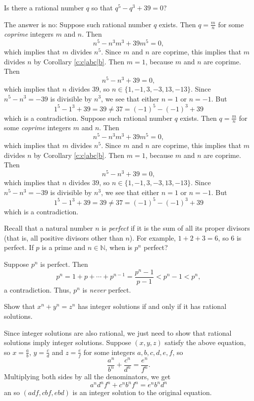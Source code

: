 \documentclass[11pt,dvipsnames]{book}
\numberwithin{figure}{section} %
\numberwithin{table}{section} %
\begin{document}
\begin{exercise} Is there a rational number $q$ so that $q^{5}-q^{3}+39=0$?

\begin{solution}
 The answer is no: Suppose such rational number $q$ exists. Then $q=\frac{m}{n}$ for some {\it coprime} integers $m$ and $n$. Then
\[
n^5-n^3m^3 + 39m^5 = 0,\]
which implies that $m$ divides $n^5$. Since $m$ and $n$ are coprime, this implies
that $m$ divides $n$ by Corollary \ref{c:c|abc|b}. Then $m = 1$, because $m$ and $n$ are coprime. Then
\[
n^5-n^3+39=0,
\]
which implies that $n$ divides $ 39$, so $n\in \{1,-1, 3,-3, 13,-13\}$. Since
$n^5-n^3 =-39$  is divisible by $n^3$, we see that either $n=1$ or $n=-1$. But
\[1^{5}-1^3+39=39\neq 37 = (-1)^{5}-(-1)^{3}+39\]
which is a contradiction. Suppose such rational number $q$ exists. Then $q=\frac{m}{n}$ for some {\it coprime} integers $m$ and $n$. Then
\[
n^5-n^3m^3 + 39m^5 = 0,\]
which implies that $m$ divides $n^5$. Since $m$ and $n$ are coprime, this implies
that $m$ divides $n$ by Corollary \ref{c:c|abc|b}. Then $m=1$, because $m$ and $n$ are coprime. Then
\[
n^5-n^3 +39=0,
\]
which implies that $n$ divides $ 39$, so $n\in \{1, -1, 3, -3, 13, -13\}$. Since
$n^5-n^3 =-39$  is divisible by $n^3$, we see that either $n=1$ or $n=-1$. But
\[1^{5}-1^3+39=39\neq 37 = (-1)^{5}-(-1)^{3}+39\]
which is a contradiction.
\end{solution}

\end{exercise}

\begin{exercise} Recall that a natural number $n$ is {\it perfect} if it is the sum of all its proper divisors (that is, all positive divisors other than $n$). For example, $1 + 2 + 3 = 6$, so $6$ is perfect. If $p$ is a prime and $n\in\mathbb{N}$, when is $p^{n}$ perfect?

\begin{solution}
Suppose $p^{n}$ is perfect. Then
\[
p^{n} = 1+p+\cdots + p^{n-1} = \frac{p^{n}-1}{p-1}<p^{n}-1<p^{n},
\]
a contradiction. Thus, $p^{n}$ is {\it never} perfect.
\end{solution}

\end{exercise}

\begin{exercise} Show that $x^{n}+y^{n}=z^{n}$ has integer solutions if and only if it has rational solutions.
\begin{solution}
Since integer solutions are also rational, we just need to show that rational solutions imply integer solutions. Suppose $(x,y,z)$ satisfy the above equation, so $x=\frac{a}{b}$, $y=\frac{c}{d}$ and $z=\frac{e}{f}$ for some integers $a,b,c,d,e,f$, so
\[
\frac{a^n}{b^n} + \frac{c^n}{d^n}=\frac{e^{n}}{f^{n}}.
\]
Multiplying both sides by all the denominators, we get
\[
a^{n}d^{n}f^{n} + c^{n}b^{n}f^{n} = e^{n} b^{n}d^{n}
\]
an so $(adf,cbf,ebd)$ is an integer solution to the original equation.
\end{solution}
\end{exercise}
\end{document}
